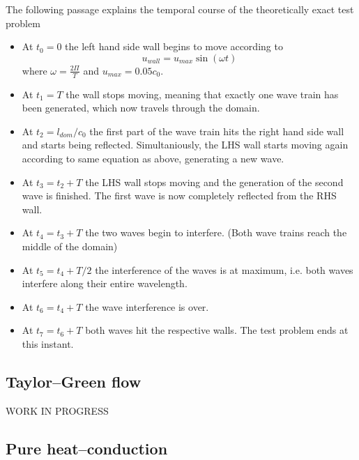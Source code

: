 \documentclass{report}
\begin{document}
The following passage explains the temporal course of the theoretically exact test problem

\begin{itemize} 
\item At $t_0=0$ the left hand side wall begins to move according to 
\begin{equation}
  u_{\mathit{wall}}=u_{\mathit{max}}\sin(\omega t) 
\end{equation}
  where $\omega=\frac{2\Pi}{T}$ and $u_{\mathit{max}}=0.05 c_0$.


\item At $t_1=T$ the wall stops moving, meaning that exactly one wave train has been generated, which now travels through the domain.

\item At $t_2=l_{\mathit{dom}}/c_0$ the first part of the wave train hits the right hand side  wall and starts being reflected. Simultaniously, the LHS wall starts moving again according to same equation as above, generating a new wave.

\item At $t_3=t_2+T$ the LHS wall stops moving and the generation of the second wave is finished. 
The first wave is now completely reflected from the RHS wall.

\item At $t_4=t_3+T$ the two waves begin to interfere. (Both wave trains reach the middle of the domain)

\item At $t_5=t_4+T/2$ the interference of the waves is at maximum, i.e. both waves interfere along their entire wavelength.

\item At $t_6=t_4+T$ the wave interference is over.

\item At $t_7=t_6+T$ both waves hit the respective walls. The test problem ends at this instant.
\end{itemize}



\subsection{Taylor--Green flow}

WORK IN PROGRESS 

\subsection{Pure heat--conduction}
 
\end{document}
